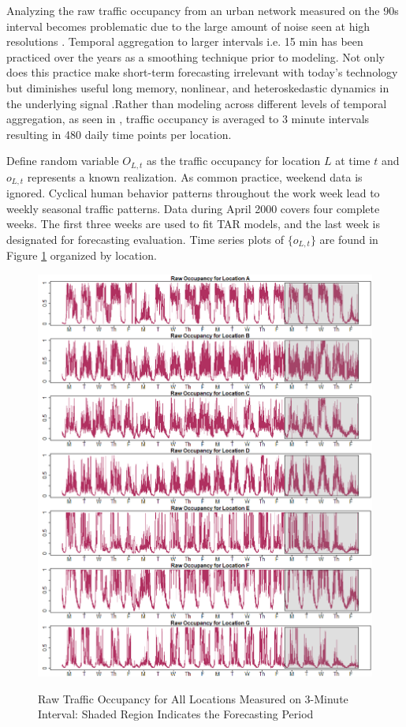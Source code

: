 Analyzing the raw traffic occupancy from an urban network measured on the 90s interval becomes problematic due to the large amount of noise seen at high resolutions \citep{Vlahogianni2014}. Temporal aggregation to larger intervals i.e. 15 min has been practiced over the years as a smoothing technique prior to modeling. Not only does this practice make short-term forecasting irrelevant with today's technology but diminishes useful long memory, nonlinear, and heteroskedastic dynamics in the underlying signal \cite{Vlahogianni2011}.Rather than modeling across different levels of temporal aggregation, as seen in \cite{Shang2006}, traffic occupancy is averaged to 3 minute intervals resulting in 480 daily time points per location. 

Define random variable $O_{L,t}$ as the traffic occupancy for location $L$ at time $t$ and $o_{L,t}$ represents a known realization. As common practice, weekend data is ignored. Cyclical human behavior patterns throughout the work week lead to weekly seasonal traffic patterns. Data during April 2000 covers four complete weeks. The first three weeks are used to fit TAR models, and the last week is designated for forecasting evaluation. Time series plots of $\{o_{L,t}\}$ are found in Figure \ref{fig:OrigPlotTrafficOcc} organized by location.

\begin{figure}[htbp]
\caption{Raw Traffic Occupancy for All Locations Measured on 3-Minute Interval: Shaded Region Indicates the Forecasting Period}
\includegraphics[width=\textwidth]{rawplots}
\label{fig:OrigPlotTrafficOcc}
\end{figure}







